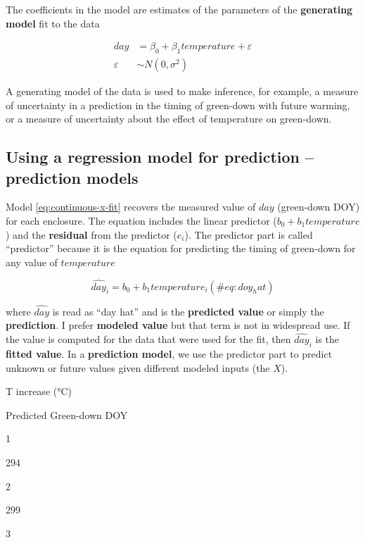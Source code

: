 \documentclass[]{book}
\begin{document}
The coefficients in the model are estimates of the parameters of the \textbf{generating model} fit to the data

\begin{align}
day &= \beta_0 + \beta_1 temperature + \varepsilon\\
\varepsilon &\sim N(0, \sigma^2)
\label{eq:continuous-x-m1}
\end{align}

A generating model of the data is used to make inference, for example, a measure of uncertainty in a prediction in the timing of green-down with future warming, or a measure of uncertainty about the effect of temperature on green-down.

\hypertarget{using-a-regression-model-for-prediction-prediction-models}{%
\subsection{Using a regression model for prediction -- prediction models}\label{using-a-regression-model-for-prediction-prediction-models}}

Model \eqref{eq:continuous-x-fit} recovers the measured value of \(day\) (green-down DOY) for each enclosure. The equation includes the linear predictor (\(b_0 + b_1 temperature\)) and the \textbf{residual} from the predictor (\(e_i\)). The predictor part is called ``predictor'' because it is the equation for predicting the timing of green-down for any value of \(temperature\)

\begin{equation}
\widehat{day}_i = b_0 + b_1 temperature_i
(\#eq:doy_hat)
\end{equation}

where \(\widehat{day}\) is read as ``day hat'' and is the \textbf{predicted value} or simply the \textbf{prediction}. I prefer \textbf{modeled value} but that term is not in widespread use. If the value is computed for the data that were used for the fit, then \(\widehat{day}_i\) is the \textbf{fitted value}. In a \textbf{prediction model}, we use the predictor part to predict unknown or future values given different modeled inputs (the \(X\)).

T increase (°C)

Predicted Green-down DOY

1

294

2

299

3
\end{document}
